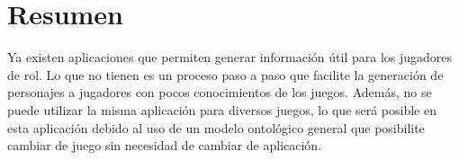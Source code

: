 
\section{Resumen}
Ya existen aplicaciones que permiten generar información útil para los jugadores de rol. Lo que no tienen es un proceso paso a paso 
que facilite la generación de personajes a jugadores con pocos conocimientos de los juegos. Además, no se puede utilizar la 
misma aplicación para diversos juegos, lo que será posible en esta aplicación debido al uso de un modelo ontológico general 
que posibilite cambiar de juego sin necesidad de cambiar de aplicación.

